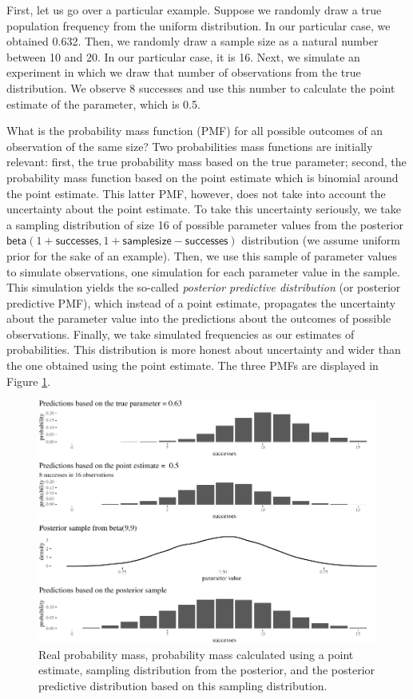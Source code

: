 \documentclass[
  10pt,
  dvipsnames,enabledeprecatedfontcommands]{scrartcl}
\newcommand{\s}[1]{\mbox{$\mathsf{#1}$}}
\begin{document}
First, let us go over a particular example. Suppose we randomly draw a
true population frequency from the uniform distribution. In our
particular case, we obtained 0.632. Then, we randomly draw a sample size
as a natural number between 10 and 20. In our particular case, it is 16.
Next, we simulate an experiment in which we draw that number of
observations from the true distribution. We observe 8 successes and use
this number to calculate the point estimate of the parameter, which is
0.5.

What is the probability mass function (PMF) for all possible outcomes of
an observation of the same size? Two probabilities mass functions are
initially relevant: first, the true probability mass based on the true
parameter; second, the probability mass function based on the point
estimate which is binomial around the point estimate. This latter PMF,
however, does not take into account the uncertainty about the point
estimate. To take this uncertainty seriously, we take a sampling
distribution of size 16 of possible parameter values from the posterior
\(\s{beta}(1+\s{successes}, 1+\s{sample size} - \s{successes})\)
distribution (we assume uniform prior for the sake of an example). Then,
we use this sample of parameter values to simulate observations, one
simulation for each parameter value in the sample. This simulation
yields the so-called \emph{posterior predictive distribution} (or
posterior predictive PMF), which instead of a point estimate, propagates
the uncertainty about the parameter value into the predictions about the
outcomes of possible observations. Finally, we take simulated
frequencies as our estimates of probabilities. This distribution is more
honest about uncertainty and wider than the one obtained using the point
estimate. The three PMFs are displayed in Figure
\ref{fig:posteriorPrediction}.

\begin{figure}[H]

\begin{center}\includegraphics[width=0.8\linewidth]{chapter-outline_files/figure-latex/fig:posteriorPrediction2-1} \end{center}


\caption{Real probability mass, probability mass calculated using a point estimate, sampling distribution from the posterior, and the posterior predictive distribution based on this sampling distribution.}
\label{fig:posteriorPrediction}
\end{figure}
\end{document}
